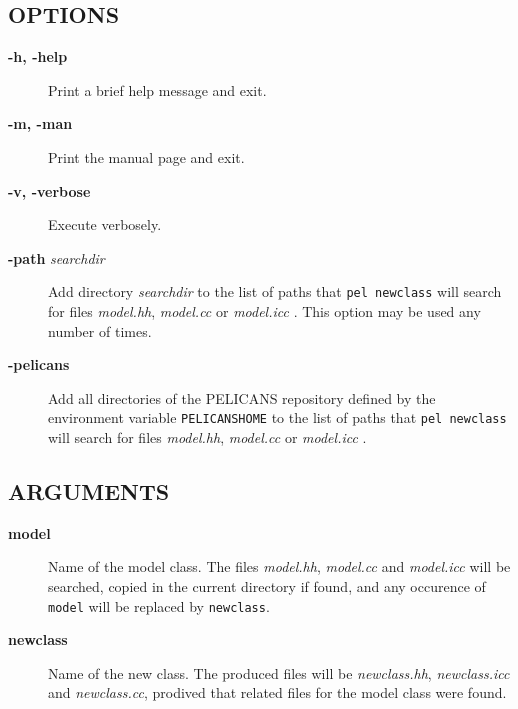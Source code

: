 \documentclass{article}
\begin{document}
\subsection*{OPTIONS\label{newclass_OPTIONS}}
\begin{description}

\item[\textbf{-h, -help}] \mbox{}

Print a brief help message and exit.


\item[\textbf{-m, -man}] \mbox{}

Print the manual page and exit.


\item[\textbf{-v, -verbose}] \mbox{}

Execute verbosely.


\item[\textbf{-path} \emph{searchdir}] \mbox{}

Add directory \emph{searchdir} to the list of paths that
\texttt{pel newclass} will search for files
\emph{model.hh}, \emph{model.cc} or \emph{model.icc} .
This option may be used any number of times.


\item[\textbf{-pelicans}] \mbox{}

Add all directories of the PELICANS repository
defined by the environment variable \texttt{PELICANSHOME}
to the list of paths that \texttt{pel newclass} will search for files
\emph{model.hh}, \emph{model.cc} or \emph{model.icc} .

\end{description}
\subsection*{ARGUMENTS\label{newclass_ARGUMENTS}}
\begin{description}

\item[\textbf{model}] \mbox{}

Name of the model class. The files \emph{model.hh}, \emph{model.cc} and \emph{model.icc}
will be searched, copied in the current directory if found,
and any occurence of \texttt{model} will be replaced by \texttt{newclass}.


\item[\textbf{newclass}] \mbox{}

Name of the new class. The produced files will be \emph{newclass.hh},
\emph{newclass.icc} and \emph{newclass.cc}, prodived that related files
for the model class were found.

\end{description}
\end{document}
